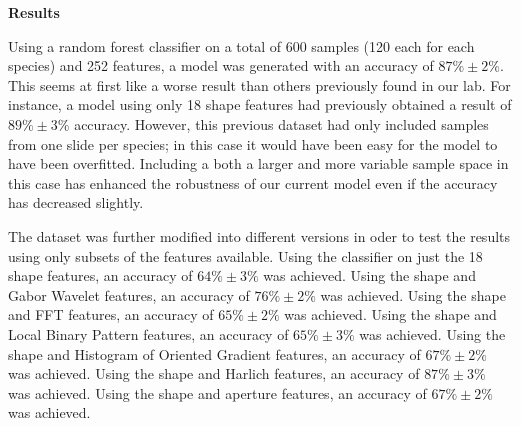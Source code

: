 \textbf{Results}

Using a random forest classifier on a total of 600 samples (120 each for each species) and 252 features, a model was generated with an accuracy of $87\% \pm 2\%$. This seems at first like a worse result than others previously found in our lab. For instance, a model using only 18 shape features had previously obtained a result of $89\% \pm 3\%$ accuracy. However, this previous dataset had only included samples from one slide per species; in this case it would have been easy for the model to have been overfitted. Including a both a larger and more variable sample space in this case has enhanced the robustness of our current model even if the accuracy has decreased slightly.

The dataset was further modified into different versions in oder to test the results using only subsets of the features available.
Using the classifier on just the 18 shape features, an accuracy of  $64\% \pm 3\%$ was achieved.
Using the shape and Gabor Wavelet features, an accuracy of $76\% \pm 2\%$ was achieved.
Using the shape and FFT features, an accuracy of $65\% \pm 2\%$ was achieved.
Using the shape and Local Binary Pattern features, an accuracy of $65\% \pm 3\%$ was achieved.
Using the shape and Histogram of Oriented Gradient features, an accuracy of $67\% \pm 2\%$ was achieved.
Using the shape and Harlich features, an accuracy of $87\% \pm 3\%$ was achieved.
Using the shape and aperture features, an accuracy of $67\% \pm 2\%$ was achieved.
